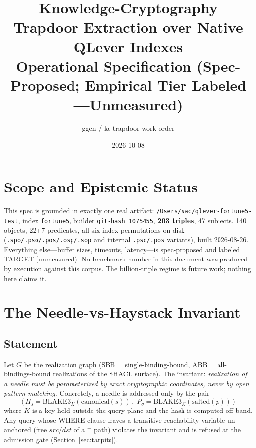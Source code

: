 \documentclass[11pt]{article}
\title{Knowledge-Cryptography Trapdoor Extraction over Native QLever Indexes\\
\large Operational Specification (Spec-Proposed; Empirical Tier Labeled \TARGET{}---Unmeasured)}
\author{ggen / kc-trapdoor work order}
\date{2026-10-08}
\newcommand{\TARGET}{\textsf{TARGET}}
\begin{document}
\maketitle

\section{Scope and Epistemic Status}

This spec is grounded in exactly one real artifact:
\texttt{/Users/sac/qlever-fortune5-test}, index \texttt{fortune5},
builder \texttt{git-hash 1075455}, \textbf{203 triples}, 47 subjects,
140 objects, 22+7 predicates, all six index permutations on disk
(\texttt{.spo/.pso/.pos/.osp/.sop} and internal \texttt{.pso/.pos}
variants), built
2026-08-26. Everything else---buffer sizes, timeouts, latency---is
spec-proposed and labeled \TARGET{} (unmeasured). No benchmark number in
this document was produced by execution against this corpus. The
billion-triple regime is future work; nothing here claims it.

\section{The Needle-vs-Haystack Invariant}

\subsection{Statement}
Let $G$ be the realization graph (SBB = single-binding-bound, ABB =
all-bindings-bound realizations of the SHACL surface). The invariant:
\emph{realization of a needle must be parameterized by exact cryptographic
coordinates, never by open pattern matching.} Concretely, a needle is
addressed only by the pair
\[
\bigl(\,H_s = \mathrm{BLAKE3}_K(\mathrm{canonical}(s))\,,\;
       P_\sigma = \mathrm{BLAKE3}_K(\mathrm{salted}(p))\,\bigr)
\]
where $K$ is a key held outside the query plane and the hash is computed
off-band. Any query whose WHERE clause leaves a transitive-reachability
variable un-anchored (free $src$/$dst$ of a $^{+}$ path) violates the
invariant and is refused at the admission gate (Section~\ref{sec:tarpits}).
\end{document}
